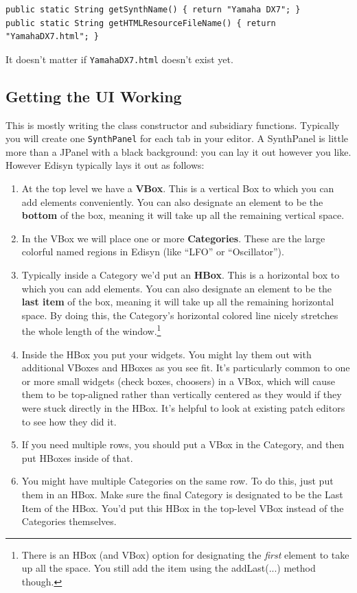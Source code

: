 \documentclass{article}
\begin{document}
\begin{verbatim}
public static String getSynthName() { return "Yamaha DX7"; }
public static String getHTMLResourceFileName() { return "YamahaDX7.html"; }
\end{verbatim}

It doesn't matter if {\tt YamahaDX7.html} doesn't exist yet.

\subsection{Getting the UI Working}

This is mostly writing the class constructor and subsidiary functions.  Typically you will create one {\tt SynthPanel} for each tab in your editor.  A SynthPanel is little more than a JPanel with a black background: you can lay it out however you like.  However Edisyn typically lays it out as follows:

\begin{enumerate}
\item At the top level we have a {\bf VBox}.  This is a vertical Box to which you can add elements conveniently.  You can also designate an element to be the {\bf bottom} of the box, meaning it will take up all the remaining vertical space.
\item In the VBox we will place one or more {\bf Categories}.  These are the large colorful named regions in Edisyn (like ``LFO'' or ``Oscillator''). 
\item Typically inside a Category we'd put an {\bf HBox}.  This is a horizontal box to which you can add elements.  You can also designate an element to be the {\bf last item} of the box, meaning it will take up all the remaining horizontal space.  By doing this, the Category's horizontal colored line nicely stretches the whole length of the window.\footnote{There is an HBox (and VBox) option for designating the {\it first} element to take up all the space.  You still add the item using the addLast(...) method though.}
\item Inside the HBox you put your widgets.  You might lay them out with additional VBoxes and HBoxes as you see fit. It's particularly common to one or more small widgets (check boxes, choosers) in a VBox, which will cause them to be top-aligned rather than vertically centered as they would if they were stuck directly in the HBox.  It's helpful to look at existing patch editors to see how they did it.
\item If you need multiple rows, you should put a VBox in the Category, and then put HBoxes inside of that.
\item You might have multiple Categories on the same row.  To do this, just put them in an HBox.  Make sure the final Category is designated to be the Last Item of the HBox.  You'd put this HBox in the top-level VBox instead of the Categories themselves.
\end{enumerate}
\end{document}
